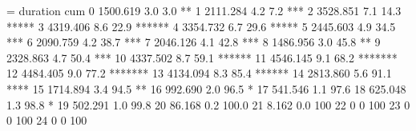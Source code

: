 \documentclass[letterpaper,10pt,english]{sphinxmanual}
\begin{document}
\begin{sphinxVerbatim}[commandchars=\\\{\}]
           \PYGZlt{}=      duration     \PYGZpc{}  cum\PYGZpc{}
        0          1500.619   3.0   3.0 **\textbar{}
        1          2111.284   4.2   7.2 ***  \textbar{}
        2          3528.851   7.1  14.3 *****      \textbar{}
        3          4319.406   8.6  22.9 ******            \textbar{}
        4          3354.732   6.7  29.6 *****                  \textbar{}
        5          2445.603   4.9  34.5 ***                        \textbar{}
        6          2090.759   4.2  38.7 ***                           \textbar{}
        7          2046.126   4.1  42.8 ***                               \textbar{}
        8          1486.956   3.0  45.8 **                                  \textbar{}
        9          2328.863   4.7  50.4 ***                                     \textbar{}
       10          4337.502   8.7  59.1 ******                                         \textbar{}
       11          4546.145   9.1  68.2 *******                                               \textbar{}
       12          4484.405   9.0  77.2 *******                                                      \textbar{}
       13          4134.094   8.3  85.4 ******                                                              \textbar{}
       14          2813.860   5.6  91.1 ****                                                                    \textbar{}
       15          1714.894   3.4  94.5 **                                                                         \textbar{}
       16           992.690   2.0  96.5 *                                                                            \textbar{}
       17           541.546   1.1  97.6                                                                               \textbar{}
       18           625.048   1.3  98.8 *                                                                              \textbar{}
       19           502.291   1.0  99.8                                                                                \textbar{}
       20            86.168   0.2 100.0                                                                                \textbar{}
       21             8.162   0.0 100                                                                                   \textbar{}
       22             0       0   100                                                                                   \textbar{}
       23             0       0   100                                                                                   \textbar{}
       24             0       0   100                                                                                   \textbar{}

\end{sphinxVerbatim}
\end{document}
